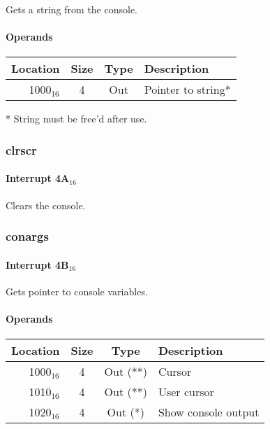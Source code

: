 \documentclass{article}
\begin{document}
Gets a string from the console.

\paragraph{Operands}

\begin{tabular}{|r|c|c|l|}
	\hline
	\textbf{Location} & \textbf{Size} & \textbf{Type} & \textbf{Description} \\
	\hline
	1000$_{16}$ & 4 & Out & Pointer to string* \\
	\hline
\end{tabular}

* String must be free'd after use.

\subsubsection{clrscr}

\paragraph{Interrupt 4A$_{16}$}

Clears the console.

\subsubsection{conargs}

\paragraph{Interrupt 4B$_{16}$}

Gets pointer to console variables.

\paragraph{Operands}

\begin{tabular}{|r|c|c|l|}
	\hline
	\textbf{Location} & \textbf{Size} & \textbf{Type} & \textbf{Description} \\
	\hline
	1000$_{16}$ & 4 & Out (**) & Cursor \\
	\hline
	1010$_{16}$ & 4 & Out (**) & User cursor \\
	\hline
	1020$_{16}$ & 4 & Out (*) & Show console output \\
	\hline
\end{tabular}
\end{document}
